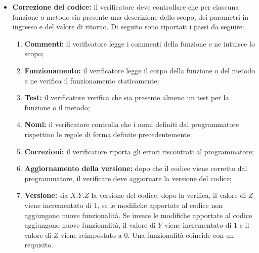 \begin{itemize}
	\item \textbf{Correzione del codice:} il verificatore deve controllare che per
	      ciascuna funzione o metodo sia presente una descrizione dello scopo,
	      dei parametri in ingresso e del valore di ritorno. Di seguito sono
	      riportati i passi da seguire:
	      \begin{enumerate}
		      \item \textbf{Commenti:} il verificatore legge i commenti della
		            funzione e ne intuisce lo scopo;

		      \item \textbf{Funzionamento:} il verificatore legge il corpo
		            della funzione o del metodo e ne verifica il funzionamento
		            staticamente;

		      \item \textbf{Test:} il verificatore verifica che sia
		            presente almeno un test per la funzione o il metodo;


		      \item \textbf{Nomi:} il verificatore controlla che i nomi definiti
		            dal programmatore rispettino le regole di forma definite
		            precedentemente;

		      \item \textbf{Correzioni:} il verificatore riporta
		            gli errori riscontrati al programmatore;

		      \item \textbf{Aggiornamento della versione:} dopo che il codice
		            viene corretto dal programmatore, il verificare deve aggiornare
		            la versione del codice;

		      \item \textbf{Versione:} sia $X.Y.Z$ la versione del codice,
		            dopo la verifica, il valore di $Z$ viene incrementato di
		            $1$, se le modifiche apportate al codice non aggiungono
		            nuove funzionalità. Se invece le modifiche apportate al
		            codice aggiungono nuove funzionalità, il valore di $Y$ viene
		            incrementato di $1$ e il valore di $Z$ viene reimpostato a
		            $0$. Una funzionalità coincide con un requisito.
	      \end{enumerate}
\end{itemize}
